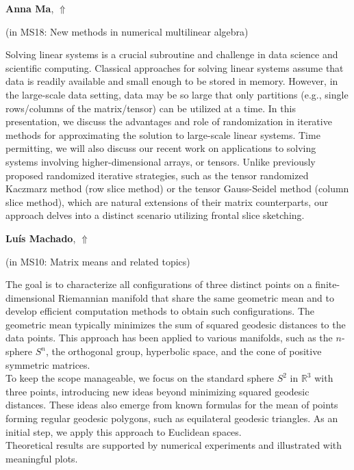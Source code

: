\documentclass[ILAS2025-program.tex]{subfiles}
\begin{document}
     \hypertarget{down0038}{}\begin{ilasabstract}
    
    \textbf{Anna Ma},  \hfill \hyperlink{up0038}{$\Uparrow$}
    
    (in {\color{mstitle}MS18: New methods in numerical multilinear algebra})
        
        \mtskip
    Solving linear systems is a crucial subroutine and challenge in data science and scientific computing. Classical approaches for solving linear systems assume that data is readily available and small enough to be stored in memory. However, in the large-scale data setting, data may be so large that only partitions (e.g., single rows/columns of the matrix/tensor) can be utilized at a time. In this presentation, we discuss the advantages and role of randomization in iterative methods for approximating the solution to large-scale linear systems. Time permitting, we will also discuss our recent work on applications to solving systems involving higher-dimensional arrays, or tensors. Unlike previously proposed randomized iterative strategies, such as the tensor randomized Kaczmarz method (row slice method) or the tensor Gauss-Seidel method (column slice method), which are natural extensions of their matrix counterparts, our approach delves into a distinct scenario utilizing frontal slice sketching.
\end{ilasabstract}
     \hypertarget{down0055}{}\begin{ilasabstract}
    
    \textbf{Luís Machado},  \hfill \hyperlink{up0055}{$\Uparrow$}
    
    (in {\color{mstitle}MS10: Matrix means and related topics})
        
        \mtskip
    The goal is to characterize all configurations of three distinct points on a finite-dimensional Riemannian manifold that share the same geometric mean and to develop efficient computation methods to obtain such configurations. The geometric mean typically minimizes the sum of squared geodesic distances to the data points. This approach has been applied to various manifolds, such as the \(n\)-sphere \(S^n\), the orthogonal group, hyperbolic space, and the cone of positive symmetric matrices.  \\
To keep the scope manageable, we focus on the standard sphere \(S^2\) in \(\mathbb{R}^3\) with three points, introducing new ideas beyond minimizing squared geodesic distances. These ideas also emerge from known formulas for the mean of points forming regular geodesic polygons, such as equilateral geodesic triangles. As an initial step, we apply this approach to Euclidean spaces. \\
Theoretical results are supported by numerical experiments and illustrated with meaningful plots.\\ \\
\end{ilasabstract}
\end{document}
